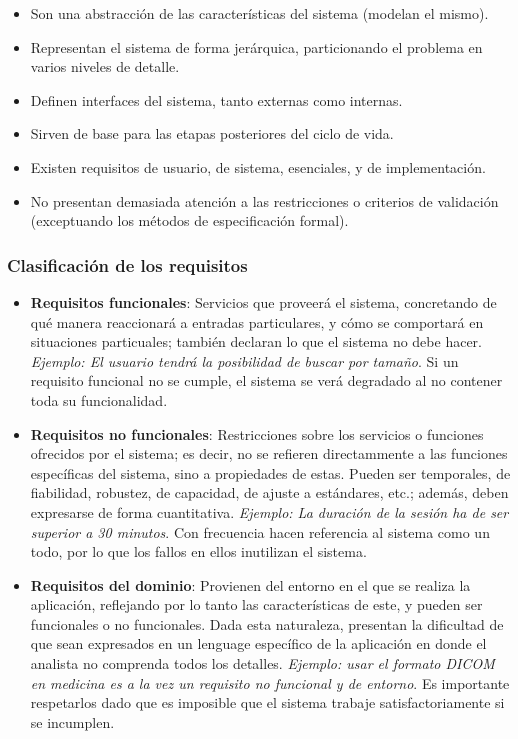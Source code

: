 \begin{itemize}
    \item Son una abstracción de las características del sistema (modelan el mismo).
    \item Representan el sistema de forma jerárquica, particionando el problema en varios niveles de detalle.
    \item Definen interfaces del sistema, tanto externas como internas.
    \item Sirven de base para las etapas posteriores del ciclo de vida.
    \item Existen requisitos de usuario, de sistema, esenciales, y de implementación.
    \item No presentan demasiada atención a las restricciones o criterios de validación (exceptuando los métodos de especificación formal).
\end{itemize}

\subsubsection{Clasificación de los requisitos}
\begin{itemize}
    \item \textbf{Requisitos funcionales}: Servicios que proveerá el sistema, concretando de qué manera reaccionará a entradas particulares, y cómo se comportará en situaciones particuales; también declaran lo que el sistema no debe hacer. \textit{Ejemplo: El usuario tendrá la posibilidad de buscar por tamaño}. Si un requisito funcional no se cumple, el sistema se verá degradado al no contener toda su funcionalidad.

    \item \textbf{Requisitos no funcionales}: Restricciones sobre los servicios o funciones ofrecidos por el sistema; es decir, no se refieren directammente a las funciones específicas del sistema, sino a propiedades de estas. Pueden ser temporales, de fiabilidad, robustez, de capacidad, de ajuste a estándares, etc.; además, deben expresarse de forma cuantitativa. \textit{Ejemplo: La duración de la sesión ha de ser superior a 30 minutos}. Con frecuencia hacen referencia al sistema como un todo, por lo que los fallos en ellos inutilizan el sistema.

    \item \textbf{Requisitos del dominio}: Provienen del entorno en el que se realiza la aplicación, reflejando por lo tanto las características de este, y pueden ser funcionales o no funcionales. Dada esta naturaleza, presentan la dificultad de que sean expresados en un lenguage específico de la aplicación en donde el analista no comprenda todos los detalles. \textit{Ejemplo: usar el formato DICOM en medicina es a la vez un requisito no funcional y de entorno}. Es importante respetarlos dado que es imposible que el sistema trabaje satisfactoriamente si se incumplen.
\end{itemize}

